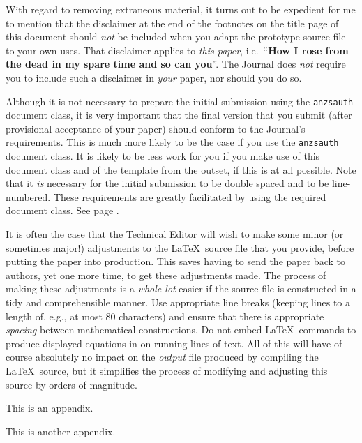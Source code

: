 \documentclass[
  times,
  doublespace]{anzsauth}
\begin{document}
With regard to removing extraneous material, it turns out to be
expedient for me to mention that the disclaimer at the end of the
footnotes on the title page of this document should \emph{not} be
included when you adapt the prototype source file to your own uses. That
disclaimer applies to \emph{this paper}, i.e.~``\textbf{How I rose from
the dead in my spare time and so can you}''. The Journal does \emph{not}
require you to include such a disclaimer in \emph{your} paper, nor
should you do so.

Although it is not necessary to prepare the initial submission using the
\texttt{anzsauth} document class, it is very important that the final
version that you submit (after provisional acceptance of your paper)
should conform to the Journal's requirements. This is much more likely
to be the case if you use the \texttt{anzsauth} document class. It is
likely to be less work for you if you make use of this document class
and of the template from the outset, if this is at all possible. Note
that it \emph{is} necessary for the initial submission to be double
spaced and to be line-numbered. These requirements are greatly
facilitated by using the required document class. See page
\pageref{pg:dsln}.

It is often the case that the Technical Editor will wish to make some
minor (or sometimes major!) adjustments to the \LaTeX~source file that
you provide, before putting the paper into production. This saves having
to send the paper back to authors, yet one more time, to get these
adjustments made. The process of making these adjustments is a
\emph{whole lot} easier if the source file is constructed in a tidy and
comprehensible manner. Use appropriate line breaks (keeping lines to a
length of, e.g., at most 80 characters) and ensure that there is
appropriate \emph{spacing} between mathematical constructions. Do not
embed \LaTeX~commands to produce displayed equations in on-running lines
of text. All of this will have of course absolutely no impact on the
\emph{output} file produced by compiling the \LaTeX~source, but it
simplifies the process of modifying and adjusting this source by orders
of magnitude.

\begin{Appendix}
\label{app:mung}

This is an appendix. \lipsum[1]

\end{Appendix}

\begin{Appendix}
\label{app:gorp}

This is another appendix. \lipsum[2]

\end{Appendix}
\end{document}
